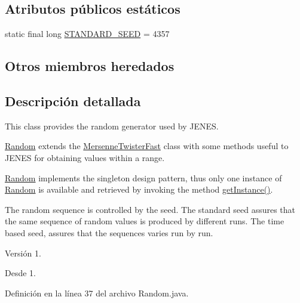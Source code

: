\subsection*{Atributos públicos estáticos}
\begin{DoxyCompactItemize}
\item 
static final long \hyperlink{classjenes_1_1utils_1_1_random_aee05c4e6476472dc9dc02d2fd94061b5}{S\-T\-A\-N\-D\-A\-R\-D\-\_\-\-S\-E\-E\-D} = 4357
\end{DoxyCompactItemize}
\subsection*{Otros miembros heredados}


\subsection{Descripción detallada}
This class provides the random generator used by J\-E\-N\-E\-S. 

\hyperlink{classjenes_1_1utils_1_1_random}{Random} extends the \hyperlink{classjenes_1_1utils_1_1_mersenne_twister_fast}{Mersenne\-Twister\-Fast} class with some methods useful to J\-E\-N\-E\-S for obtaining values within a range. 

\hyperlink{classjenes_1_1utils_1_1_random}{Random} implements the singleton design pattern, thus only one instance of \hyperlink{classjenes_1_1utils_1_1_random}{Random} is available and retrieved by invoking the method \hyperlink{classjenes_1_1utils_1_1_random_aa8b8341f82ccf69de0b44c9f6f174820}{get\-Instance()}. 

The random sequence is controlled by the seed. The standard seed assures that the same sequence of random values is produced by different runs. The time based seed, assures that the sequences varies run by run. 

\begin{DoxyVersion}{Versión}
1. 
\end{DoxyVersion}
\begin{DoxySince}{Desde}
1. 
\end{DoxySince}


Definición en la línea 37 del archivo Random.\-java.



